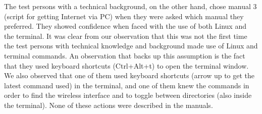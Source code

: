 The test persons with a technical background, on the other hand, chose manual 3 (script for getting Internet via PC) when they were asked which manual they preferred. They showed confidence when faced with the use of both Linux and the terminal. It was clear from our observation that this was not the first time the test persons with technical knowledge and background made use of Linux and terminal commands. An observation that backs up this assumption is the fact that they used keyboard shortcuts (Ctrl+Alt+t) to open the terminal window. We also observed that one of them used keyboard shortcuts (arrow up to get the latest command used) in the terminal, and one of them knew the commands in order to find the wireless interface and to toggle between directories (also inside the terminal). None of these actions were described in the manuals.  

